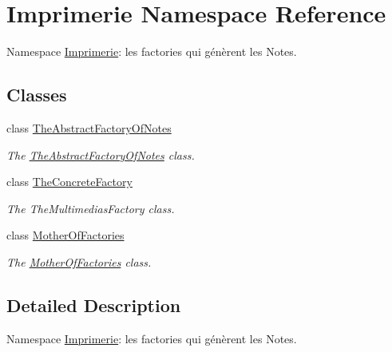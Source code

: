 \hypertarget{namespace_imprimerie}{\section{Imprimerie Namespace Reference}
\label{namespace_imprimerie}
}


Namespace \hyperlink{namespace_imprimerie}{Imprimerie}\-: les factories qui génèrent les Notes.  


\subsection*{Classes}
\begin{DoxyCompactItemize}
\item 
class \hyperlink{class_imprimerie_1_1_the_abstract_factory_of_notes}{The\-Abstract\-Factory\-Of\-Notes}
\begin{DoxyCompactList}\small\item\em The \hyperlink{class_imprimerie_1_1_the_abstract_factory_of_notes}{The\-Abstract\-Factory\-Of\-Notes} class. \end{DoxyCompactList}\item 
class \hyperlink{class_imprimerie_1_1_the_concrete_factory}{The\-Concrete\-Factory}
\begin{DoxyCompactList}\small\item\em The The\-Multimedias\-Factory class. \end{DoxyCompactList}\item 
class \hyperlink{class_imprimerie_1_1_mother_of_factories}{Mother\-Of\-Factories}
\begin{DoxyCompactList}\small\item\em The \hyperlink{class_imprimerie_1_1_mother_of_factories}{Mother\-Of\-Factories} class. \end{DoxyCompactList}\end{DoxyCompactItemize}


\subsection{Detailed Description}
Namespace \hyperlink{namespace_imprimerie}{Imprimerie}\-: les factories qui génèrent les Notes. 